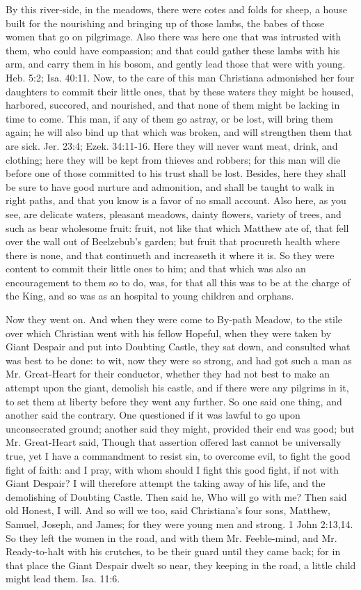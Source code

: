 By this river-side, in the meadows, there were cotes and folds for sheep, a house built for the nourishing and bringing up of those lambs, the babes of those women that go on pilgrimage. Also there was here one that was intrusted with them, who could have compassion; and that could gather these lambs with his arm, and carry them in his bosom, and gently lead those that were with young. Heb. 5:2; Isa. 40:11. Now, to the care of this man Christiana admonished her four daughters to commit their little ones, that by these waters they might be housed, harbored, succored, and nourished, and that none of them might be lacking in time to come. This man, if any of them go astray, or be lost, will bring them again; he will also bind up that which was broken, and will strengthen them that are sick. Jer. 23:4; Ezek. 34:11-16. Here they will never want meat, drink, and clothing; here they will be kept from thieves and robbers; for this man will die before one of those committed to his trust shall be lost. Besides, here they shall be sure to have good nurture and admonition, and shall be taught to walk in right paths, and that you know is a favor of no small account. Also here, as you see, are delicate waters, pleasant meadows, dainty flowers, variety of trees, and such as bear wholesome fruit: fruit, not like that which Matthew ate of, that fell over the wall out of Beelzebub's garden; but fruit that procureth health where there is none, and that continueth and increaseth it where it is. So they were content to commit their little ones to him; and that which was also an encouragement to them so to do, was, for that all this was to be at the charge of the King, and so was as an hospital to young children and orphans.

Now they went on. And when they were come to By-path Meadow, to the stile over which Christian went with his fellow Hopeful, when they were taken by Giant Despair and put into Doubting Castle, they sat down, and consulted what was best to be done: to wit, now they were so strong, and had got such a man as Mr. Great-Heart for their conductor, whether they had not best to make an attempt upon the giant, demolish his castle, and if there were any pilgrims in it, to set them at liberty before they went any further. So one said one thing, and another said the contrary. One questioned if it was lawful to go upon unconsecrated ground; another said they might, provided their end was good; but Mr. Great-Heart said, Though that assertion offered last cannot be universally true, yet I have a commandment to resist sin, to overcome evil, to fight the good fight of faith: and I pray, with whom should I fight this good fight, if not with Giant Despair? I will therefore attempt the taking away of his life, and the demolishing of Doubting Castle. Then said he, Who will go with me? Then said old Honest, I will. And so will we too, said Christiana's four sons, Matthew, Samuel, Joseph, and James; for they were young men and strong. 1 John 2:13,14. So they left the women in the road, and with them Mr. Feeble-mind, and Mr. Ready-to-halt with his crutches, to be their guard until they came back; for in that place the Giant Despair dwelt so near, they keeping in the road, a little child might lead them. Isa. 11:6.

